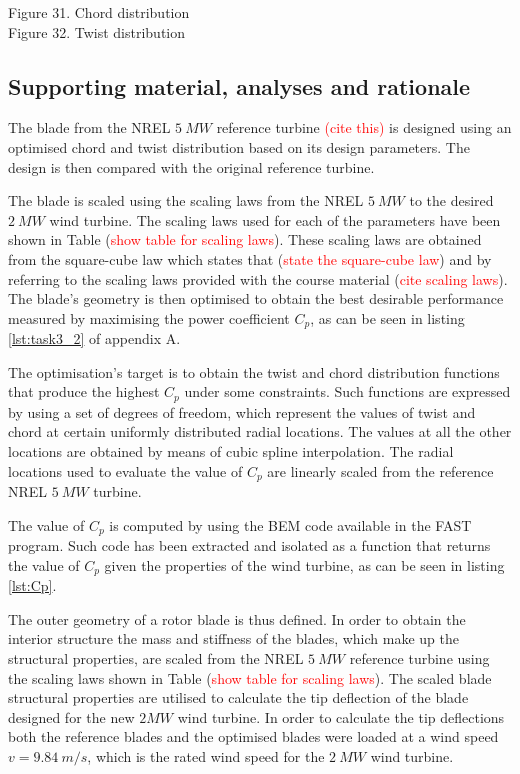 Figure 31. Chord distribution\\

Figure 32. Twist distribution\\

\subsection{Supporting material, analyses and rationale}
The blade from the NREL $5\ MW$ reference turbine \textcolor{red}{(cite this)} is designed using an optimised chord and twist distribution based on its design parameters. The design is then compared with the original reference turbine.

The blade is scaled using the scaling laws from the NREL $5\ MW$ to the desired $2\ MW$ wind turbine. The scaling laws used for each of the parameters have been shown in Table (\textcolor{red}{show table for scaling laws}). These scaling laws are obtained from the square-cube law which states that (\textcolor{red}{state the square-cube law}) and by referring to the scaling laws provided with the course material (\textcolor{red}{cite scaling laws}). The blade's geometry is then optimised to obtain the best desirable performance measured by maximising the power coefficient $C_p$, as can be seen in listing \ref{lst:task3_2} of appendix A.

The optimisation's target is to obtain the twist and chord distribution functions that produce the highest $C_p$ under some constraints. Such functions are expressed by using a set of degrees of freedom, which represent the values of twist and chord at certain uniformly distributed radial locations. The values at all the other locations are obtained by means of cubic spline interpolation. The radial locations used to evaluate the value of $C_p$ are linearly scaled from the reference NREL $5\ MW$ turbine.

The value of $C_p$ is computed by using the BEM code available in the FAST program. Such code has been extracted and isolated as a function that returns the value of $C_p$ given the properties of the wind turbine, as can be seen in listing \ref{lst:Cp}.


The outer geometry of a rotor blade is thus defined. In order to obtain the interior structure the mass and stiffness of the blades, which make up the structural properties, are scaled from the NREL $5\ MW$ reference turbine using the scaling laws shown in Table (\textcolor{red}{show table for scaling laws}). The scaled blade structural properties are utilised to calculate the tip deflection of the blade designed for the new $2 MW$ wind turbine. In order to calculate the tip deflections both the reference blades and the optimised blades were loaded at a wind speed $v=9.84\ m/s$, which is the rated wind speed for the $2\ MW$ wind turbine.

